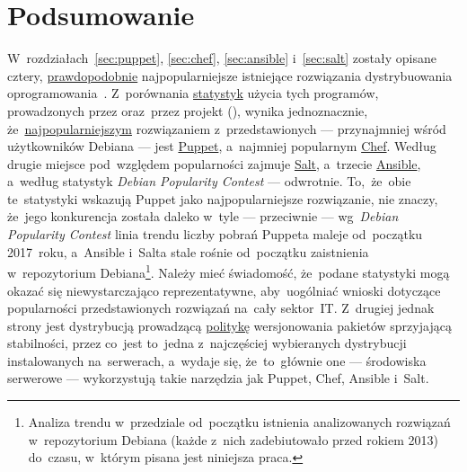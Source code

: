 \documentclass[thesis]{subfiles}
\begin{document}

\section{Podsumowanie}

W~rozdziałach~\ref{sec:puppet}, \ref{sec:chef}, \ref{sec:ansible} i~\ref{sec:salt} zostały opisane cztery, \href{http://www.infoworld.com/article/2609482/data-center/data-center-review-puppet-vs-chef-vs-ansible-vs-salt.html}{prawdopodobnie} najpopularniejsze istniejące rozwiązania dystrybuowania oprogramowania~\cite{leading-scms}. Z~porównania \href{https://www.openhub.net/p/_compare?project_0=Puppet&project_2=salt&project_1=Ansible}{statystyk} użycia tych programów, prowadzonych przez  oraz~przez projekt  (), wynika jednoznacznie, że~\href{https://qa.debian.org/popcon.php?package=puppet}{najpopularniejszym} rozwiązaniem z~przedstawionych --- przynajmniej wśród użytkowników Debiana --- jest \href{https://qa.debian.org/popcon.php?package=puppet}{Puppet}, a~najmniej popularnym \href{https://qa.debian.org/popcon.php?package=chef}{Chef}. Według~ drugie miejsce pod~względem popularności zajmuje \href{https://qa.debian.org/popcon.php?package=salt}{Salt}, a~trzecie \href{https://qa.debian.org/popcon.php?package=ansible}{Ansible}, a~według statystyk \emph{Debian Popularity Contest} --- odwrotnie. To,~że~obie te~statystyki wskazują Puppet jako najpopularniejsze rozwiązanie, nie znaczy, że~jego konkurencja została daleko w~tyle --- przeciwnie --- wg~\emph{Debian Popularity Contest} linia trendu liczby pobrań Puppeta maleje od~początku 2017~roku, a~Ansible i~Salta stale rośnie od~początku zaistnienia w~repozytorium Debiana\footnote{Analiza trendu w~przedziale od~początku istnienia analizowanych rozwiązań w~repozytorium Debiana (każde z~nich zadebiutowało przed rokiem 2013) do~czasu, w~którym pisana jest niniejsza praca.}. Należy mieć świadomość, że~podane statystyki mogą okazać się niewystarczająco reprezentatywne, aby~uogólniać wnioski dotyczące popularności przedstawionych rozwiązań na~cały sektor~IT. Z~drugiej jednak strony \debian{} jest dystrybucją prowadzącą \href{https://www.debian.org/doc/manuals/debian-faq/ch-ftparchives#s-frozen}{politykę} wersjonowania pakietów sprzyjającą stabilności, przez co~jest to~jedna z~najczęściej wybieranych dystrybucji  instalowanych na~serwerach, a~wydaje się, że~to~głównie one --- środowiska serwerowe --- wykorzystują takie narzędzia jak Puppet, Chef, Ansible i~Salt.
\end{document}
